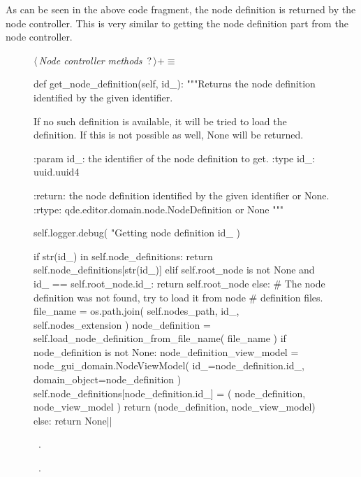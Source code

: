 \documentclass[%
    a4paper,    %
    justified,  %
    nobib,      %
    openany     %
]{tufte-book}
\makeatletter
\renewcommand{\label}[1]{\@tufte@label{##1}}%
\makeatother
\begin{document}
As can be seen in the above code fragment, the node definition is returned by
the node controller. This is very similar to getting the node definition part
from the node controller.

\begin{figure}
\begin{flushleft} \small
\begin{minipage}{\linewidth}\label{scrap141}\raggedright\small
{} $\langle\,${\itshape Node controller methods}\nobreak\ {\footnotesize {?}}$\,\rangle+\equiv$
\vspace{-1ex}
\begin{pythoncode}
def get_node_definition(self, id_):
    """Returns the node definition identified by the given identifier.

    If no such definition is available, it will be tried to load the
    definition. If this is not possible as well, None will be returned.

    :param id_: the identifier of the node definition to get.
    :type  id_: uuid.uuid4

    :return: the node definition identified by the given identifier or None.
    :rtype:  qde.editor.domain.node.NodeDefinition or None
    """

    self.logger.debug(
        "Getting node definition %
        id_
    )

    if str(id_) in self.node_definitions:
        return self.node_definitions[str(id_)]
    elif self.root_node is not None and id_ == self.root_node.id_:
        return self.root_node
    else:
        # The node definition was not found, try to load it from node
        # definition files.
        file_name = os.path.join(
            self.nodes_path,
            id_,
            self.nodes_extension
        )
        node_definition = self.load_node_definition_from_file_name(
            file_name
        )
        if node_definition is not None:
            node_definition_view_model = node_gui_domain.NodeViewModel(
                id_=node_definition.id_,
                domain_object=node_definition
            )
            self.node_definitions[node_definition.id_] = (
                node_definition,
                node_view_model
            )
            return (node_definition, node_view_model)
        else:
            return None|\NWsep|
\end{pythoncode}
\vspace{1.5ex}
\footnotesize
\begin{list}{}{\setlength{\itemsep}{-\parsep}\setlength{\itemindent}{-\leftmargin}}
\item \NWtxtMacroDefBy\ .
\item \NWtxtMacroRefIn\ .


\end{list}
\end{minipage}
\end{flushleft}
\end{figure}
\end{document}
